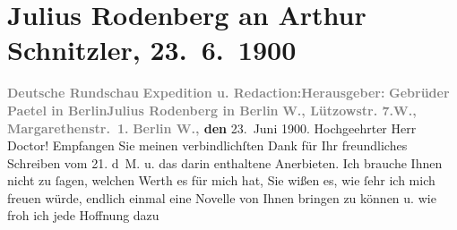 

               \section[Julius Rodenberg an Arthur Schnitzler, 23. 6. 1900]{ Julius Rodenberg an Arthur Schnitzler, 23. 6. 1900}\nopagebreak{}\rehead{ }\begin{ledgroupsized}[t]{13cm}\normalsize\beginnumbering{} \toendnotes[C]{\smallbreak\pagebreak[2]} 
\toendnotes[C]{\smallbreak}\pstart
           \noindent{}\centering{}{\pb}\textcolor{gray}{\textbf{Deutsche Rundschau}}\pend
           \pstart
           \noindent{}\textcolor{gray}{\textbf{Expedition u. Redaction:}}\hfill \textcolor{gray}{\textbf{Herausgeber:}}\pend
           \pstart
           \textcolor{gray}{\textbf{Gebrüder Paetel in Berlin}}\hfill \textcolor{gray}{\textbf{Julius Rodenberg in Berlin}}\pend
           \pstart
           \textcolor{gray}{\textbf{W., Lützowstr. 7.}}\hfill \textcolor{gray}{\textbf{W., Margarethenstr. 1.}}\pend
           \pstart
           \raggedleft{}\textbf{\textcolor{gray}{\textbf{Berlin W.,}} den}{ }23. Juni 1900.\pend
           \pstart{}Hochgeehrter Herr Doctor!\pend\pstart
           Empfangen Sie meinen verbindlichſten Dank für Ihr freundliches Schreiben vom
                        21. d M. u. das darin enthaltene Anerbieten. Ich brauche Ihnen
                    nicht zu ſagen, welchen Werth es für mich hat, Sie wißen es, wie ſehr ich mich
                    freuen würde, endlich einmal eine Novelle von Ihnen bringen zu können u. wie froh ich jede Hoffnung dazu

\end{ledgroupsized}

